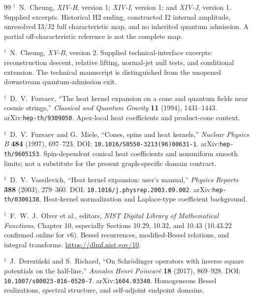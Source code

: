 \documentclass[11pt,a4paper]{article}
\theoremstyle{plain}
\theoremstyle{definition}
\theoremstyle{remark}
\numberwithin{equation}{section}
\begin{document}
\begin{thebibliography}{99}
\(^{\dagger}\)\ N.~Cheung,
\emph{XIV-H}, version 1;
\emph{XIV-I}, version 1; and
\emph{XIV-J}, version 1.
Supplied excerpts.
Historical H2 ending, constructed I2 internal amplitude,
unresolved I3/J2 full characteristic map, and no inherited
quantum admission.
A partial off-characteristic reference is not the complete map.

\(^{\dagger}\)\ N.~Cheung,
\emph{XV-B},
version 2.
Supplied technical-interface excerpts:
reconstruction descent, relative lifting, normal-jet null tests,
and conditional extension.
The technical manuscript is distinguished from the unopened
downstream quantum-admission exit.

\(^{\ddagger}\)\ D.~V.~Fursaev,
``The heat kernel expansion on a cone and quantum fields near
cosmic strings,''
\emph{Classical and Quantum Gravity}
\textbf{11} (1994), 1431--1443.
arXiv:\nolinkurl{hep-th/9309050}.
Apex-local heat coefficients and product-cone context.

\(^{\ddagger}\)\ D.~V.~Fursaev and G.~Miele,
``Cones, spins and heat kernels,''
\emph{Nuclear Physics B}
\textbf{484} (1997), 697--723.
DOI: \nolinkurl{10.1016/S0550-3213(96)00631-1}.
arXiv:\nolinkurl{hep-th/9605153}.
Spin-dependent conical heat coefficients and nonuniform smooth limits;
not a substitute for the present graph-specific domain contract.

\(^{\ddagger}\)\ D.~V.~Vassilevich,
``Heat kernel expansion: user's manual,''
\emph{Physics Reports}
\textbf{388} (2003), 279--360.
DOI: \nolinkurl{10.1016/j.physrep.2003.09.002}.
arXiv:\nolinkurl{hep-th/0306138}.
Heat-kernel normalization and Laplace-type coefficient background.

\(^{\ddagger}\)\ F.~W.~J.~Olver et al., editors,
\emph{NIST Digital Library of Mathematical Functions},
Chapter 10, especially Sections 10.29, 10.32, and 10.43
(10.43.22 confirmed online for v6).
Bessel recurrences, modified-Bessel relations, and integral transforms.
\url{https://dlmf.nist.gov/10}.

\(^{\ddagger}\)\ J.~Derezi\'nski and S.~Richard,
``On Schr\"odinger operators with inverse square potentials
on the half-line,''
\emph{Annales Henri Poincar\'e}
\textbf{18} (2017), 869--928.
DOI: \nolinkurl{10.1007/s00023-016-0520-7}.
arXiv:\nolinkurl{1604.03340}.
Homogeneous Bessel realizations, spectral structure,
and self-adjoint endpoint domains.


\end{thebibliography}
\end{document}
